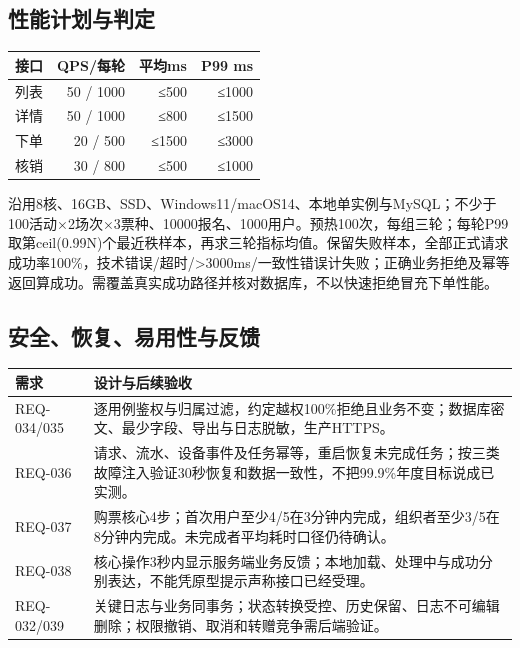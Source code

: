 \documentclass[UTF8,zihao=-4,fontset=windows]{ctexart}
\begin{document}
\subsection{性能计划与判定}
\begin{small}
\noindent\begin{tabularx}{\linewidth}{Xrrr}
\toprule
接口 & QPS/每轮 & 平均ms & P99 ms \\ \midrule
列表 & 50 / 1000 & ≤500 & ≤1000 \\
详情 & 50 / 1000 & ≤800 & ≤1500 \\
下单 & 20 / 500 & ≤1500 & ≤3000 \\
核销 & 30 / 800 & ≤500 & ≤1000 \\
\bottomrule
\end{tabularx}
\end{small}\par\smallskip
沿用8核、16GB、SSD、Windows11/macOS14、本地单实例与MySQL；不少于100活动×2场次×3票种、10000报名、1000用户。预热100次，每组三轮；每轮P99取第ceil(0.99N)个最近秩样本，再求三轮指标均值。保留失败样本，全部正式请求成功率100\%，技术错误/超时/>3000ms/一致性错误计失败；正确业务拒绝及幂等返回算成功。需覆盖真实成功路径并核对数据库，不以快速拒绝冒充下单性能。


\clearpage

\subsection{安全、恢复、易用性与反馈}
\begin{small}
\noindent\begin{tabularx}{\linewidth}{p{31mm}X}
\toprule
需求 & 设计与后续验收 \\ \midrule
REQ-034/035 & 逐用例鉴权与归属过滤，约定越权100\%拒绝且业务不变；数据库密文、最少字段、导出与日志脱敏，生产HTTPS。 \\
REQ-036 & 请求、流水、设备事件及任务幂等，重启恢复未完成任务；按三类故障注入验证30秒恢复和数据一致性，不把99.9\%年度目标说成已实测。 \\
REQ-037 & 购票核心4步；首次用户至少4/5在3分钟内完成，组织者至少3/5在8分钟内完成。未完成者平均耗时口径仍待确认。 \\
REQ-038 & 核心操作3秒内显示服务端业务反馈；本地加载、处理中与成功分别表达，不能凭原型提示声称接口已经受理。 \\
REQ-032/039 & 关键日志与业务同事务；状态转换受控、历史保留、日志不可编辑删除；权限撤销、取消和转赠竞争需后端验证。 \\
\bottomrule
\end{tabularx}
\end{small}\par\smallskip
\end{document}
